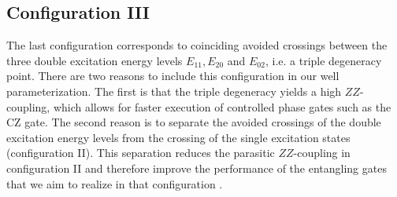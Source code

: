 \documentclass[twocolumn,superscriptaddress,unsortedaddress,
 amsmath,amssymb,
 aps,
]{revtex4-2}
\begin{document}

    \subsection{Configuration III}
        The last configuration corresponds to coinciding avoided crossings between the three double excitation energy levels $E_{11}, E_{20}$ and $E_{02}$, i.e. a triple degeneracy point. There are two reasons to include this configuration in our well parameterization. The first is that the triple degeneracy yields a high $ZZ$-coupling, which allows for faster execution of controlled phase gates such as the CZ gate. The second reason is to separate the avoided crossings of the double excitation energy levels from the crossing of the single excitation states (configuration II). This separation reduces the parasitic $ZZ$-coupling in configuration II and therefore improve the performance of the entangling gates that we aim to realize in that configuration \cite{triple-avoided-crossing}. 
\end{document}
